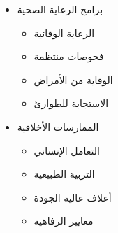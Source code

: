 \begin{itemize}
\begin{itemize}
        \item برامج الرعاية الصحية
        \begin{itemize}
            \item الرعاية الوقائية
            \item فحوصات منتظمة
            \item الوقاية من الأمراض
            \item الاستجابة للطوارئ
        \end{itemize}
        
        \item الممارسات الأخلاقية
        \begin{itemize}
            \item التعامل الإنساني
            \item التربية الطبيعية
            \item أعلاف عالية الجودة
            \item معايير الرفاهية
        \end{itemize}
    \end{itemize}
\end{itemize}

